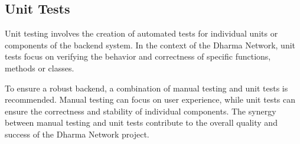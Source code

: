 \subsection{Unit Tests}
Unit testing involves the creation of automated tests for individual units or components of the backend system. In the context of the Dharma Network, unit tests focus on verifying the behavior and correctness of specific functions, methods or classes.\newline

To ensure a robust backend, a combination of manual testing and unit tests is recommended. Manual testing can focus on user experience, while unit tests can ensure the correctness and stability of individual components. The synergy between manual testing and unit tests contribute to the overall quality and success of the Dharma Network project.\newline

